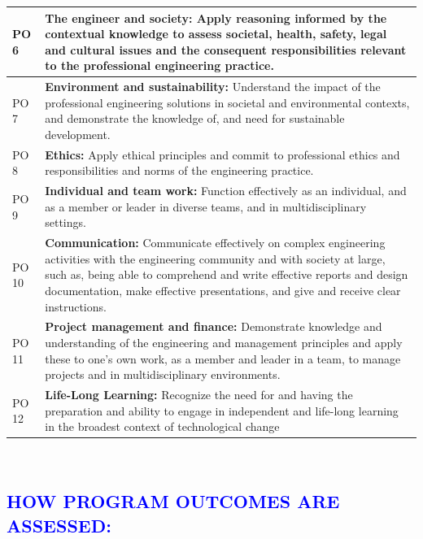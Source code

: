 \documentclass[11pt]{exam}
\begin{document}
\begin{flushleft}
\begin{longtable}{|>{\centering\arraybackslash}p{1.6cm}  | >{\raggedright\arraybackslash}p{15cm}  | }
		PO 6& \textbf{The  engineer  and  society:} Apply reasoning informed by the contextual knowledge to assess 
		societal,  health,  safety,  legal  and  cultural  issues  and  the  consequent  responsibilities  relevant  to 
		the professional engineering practice. \\ \hline
		PO 7&  \textbf{Environment  and  sustainability:}  Understand  the  impact  of  the  professional  engineering 
		solutions  in  societal  and  environmental  contexts,  and  demonstrate  the  knowledge  of,  and  need 
		for sustainable development. \\ \hline
		PO 8& \textbf{Ethics:}  Apply  ethical  principles  and  commit  to  professional  ethics  and  responsibilities  and 
		norms of the engineering practice. \\ \hline
		PO 9& \textbf{Individual and team work:} Function effectively as an individual, and as a member or leader 
		in diverse teams, and in multidisciplinary settings. \\ \hline
		PO 10&  \textbf{Communication: } Communicate  effectively  on  complex  engineering  activities  with  the 
		engineering  community  and  with  society  at  large,  such  as,  being  able  to  comprehend  and  write 
		effective  reports  and  design  documentation,  make  effective  presentations,  and  give  and  receive 
		clear instructions. \\ \hline
		PO 11&  \textbf{Project management  and  finance: } Demonstrate  knowledge  and  understanding  of  the 
		engineering  and  management  principles  and  apply  these  to  one’s  own  work,  as  a  member  and 
		leader in a team, to manage projects and in multidisciplinary environments. \\ \hline
		PO 12&	\textbf{Life-Long Learning:} Recognize the need for and having the preparation and ability to engage in independent and life-long learning in the broadest context of technological change\\ \hline
	\end{longtable}
\end{flushleft}\
\vspace{-2.0cm}
\textcolor{blue}{\section{\large \bfseries HOW PROGRAM OUTCOMES ARE ASSESSED:}}\vspace{-0.4cm}
\end{document}
